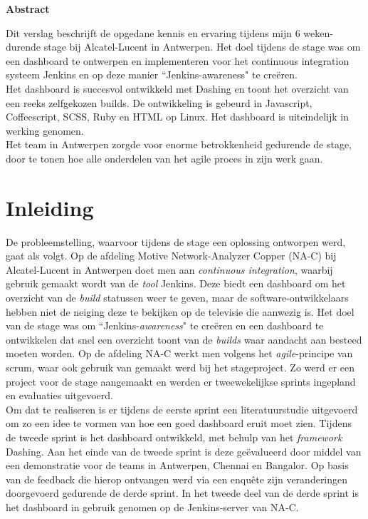 \documentclass[10pt,a4paper]{article}
\begin{document}
\begin{center}
\textbf{Abstract}\\
\end{center}
Dit verslag beschrijft de opgedane kennis en ervaring tijdens mijn 6 weken-durende stage bij Alcatel-Lucent in Antwerpen. Het doel tijdens de stage was om een dashboard te ontwerpen en implementeren voor het continuous integration systeem Jenkins en op deze manier ``Jenkins-awareness" te cre\"eren.\\
Het dashboard is succesvol ontwikkeld met Dashing en toont het overzicht van een reeks zelfgekozen builds. De ontwikkeling is gebeurd in Javascript, Coffeescript, SCSS, Ruby en HTML op Linux. Het dashboard is uiteindelijk in werking genomen.\\
Het team in Antwerpen zorgde voor enorme betrokkenheid gedurende de stage, door te tonen hoe alle onderdelen van het agile proces in zijn werk gaan. 

\tableofcontents
\clearpage

\section{Inleiding}
De probleemstelling, waarvoor tijdens de stage een oplossing ontworpen werd, gaat als volgt. Op de afdeling Motive Network-Analyzer Copper (NA-C) bij Alcatel-Lucent in Antwerpen doet men aan \textit{continuous integration}, waarbij gebruik gemaakt wordt van de \textit{tool} Jenkins. Deze biedt een dashboard om het overzicht van de \textit{build} statussen weer te geven, maar de software-ontwikkelaars hebben niet de neiging deze te bekijken op de televisie die aanwezig is. Het doel van de stage was om ``Jenkins-\textit{awareness}" te cre\"eren en een dashboard te ontwikkelen dat snel een overzicht toont van de \textit{builds} waar aandacht aan besteed moeten worden. Op de afdeling NA-C werkt men volgens het \textit{agile}-principe van scrum, waar ook gebruik van gemaakt werd bij het stageproject. Zo werd er een project voor de stage aangemaakt en werden er tweewekelijkse sprints ingepland en evaluaties uitgevoerd.\\

Om dat te realiseren is er tijdens de eerste sprint een literatuurstudie uitgevoerd om zo een idee te vormen van hoe een goed dashboard eruit moet zien. Tijdens de tweede sprint is het dashboard ontwikkeld, met behulp van het \textit{framework} Dashing. Aan het einde van de tweede sprint is deze ge\"evalueerd door middel van een demonstratie voor de teams in Antwerpen, Chennai en Bangalor. Op basis van de feedback die hierop ontvangen werd via een enqu\^ete zijn veranderingen doorgevoerd gedurende de derde sprint. In het tweede deel van de derde sprint is het dashboard in gebruik genomen op de Jenkins-server van NA-C.\\
\end{document}
